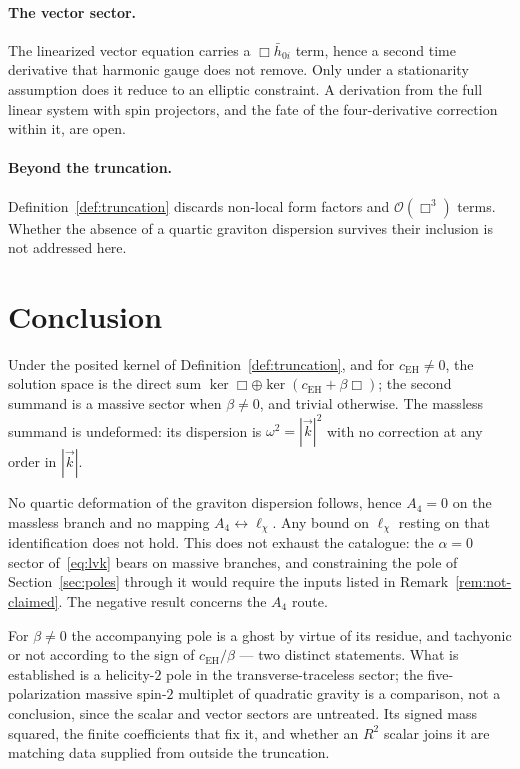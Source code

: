 \documentclass[12pt,a4paper]{article}
\theoremstyle{definition}
\newcommand{\cEH}{c_{\mathrm{EH}}}
\begin{document}
    \paragraph{The vector sector.}
      The linearized vector equation carries a $\Box\bar h_{0i}$ term, hence a second time derivative that
      harmonic gauge does not remove. Only under a stationarity assumption does it reduce to an elliptic
      constraint. A derivation from the full linear system with spin projectors, and the fate of the
      four-derivative correction within it, are open.

    \paragraph{Beyond the truncation.}
      Definition~\ref{def:truncation} discards non-local form factors and $\mathcal{O}(\Box^3)$ terms. Whether the
      absence of a quartic graviton dispersion survives their inclusion is not addressed here.

  \section{Conclusion}
    \label{sec:conclusion}

    Under the posited kernel of Definition~\ref{def:truncation}, and for $\cEH \neq 0$, the solution space is the
    direct sum $\ker\Box \oplus \ker(\cEH + \beta\Box)$; the second summand is a massive sector when
    $\beta \neq 0$, and trivial otherwise. The massless summand is undeformed: its dispersion is
    $\omega^2 = |\vec k|^2$ with no correction at any order in $|\vec k|$.

    No quartic deformation of the graviton dispersion follows, hence $A_4 = 0$ on the massless branch and no
    mapping $A_4 \leftrightarrow \ell_\chi$. Any bound on $\ell_\chi$ resting on that identification does not
    hold. This does not exhaust the catalogue: the $\alpha = 0$ sector of~\eqref{eq:lvk} bears on massive
    branches, and constraining the pole of Section~\ref{sec:poles} through it would require the inputs listed in
    Remark~\ref{rem:not-claimed}. The negative result concerns the $A_4$ route.

    For $\beta \neq 0$ the accompanying pole is a ghost by virtue of its residue, and tachyonic or not according
    to the sign of $\cEH/\beta$ --- two distinct statements. What is established is a helicity-$2$ pole in the
    transverse-traceless sector; the five-polarization massive spin-$2$ multiplet of quadratic gravity is a
    comparison, not a conclusion, since the scalar and vector sectors are untreated. Its signed mass squared, the
    finite coefficients that fix it, and whether an $R^2$ scalar joins it are matching data supplied from outside
    the truncation.
\end{document}
